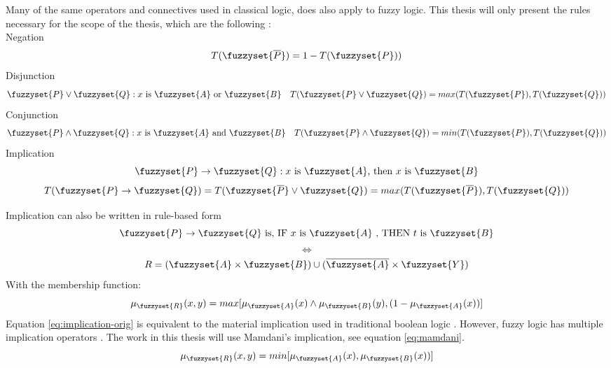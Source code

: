 Many of the same operators and connectives used in classical logic, does also apply to fuzzy logic. This thesis will only present the rules necessary for the scope of the thesis, which are the following \cite{ross2009fuzzy}:\\
\noindent Negation
\begin{equation}
    T(\fuzzyset{\overline{P}})=1-T(\fuzzyset{P})) {}\label{eq:negation}
\end{equation}
Disjunction
\begin{equation}
    \fuzzyset{P}\lor \fuzzyset{Q}:x \text{ is } \fuzzyset{A} \text{ or } \fuzzyset{B}\quad T(\fuzzyset{P} \lor \fuzzyset{Q})=max(T(\fuzzyset{P}),T(\fuzzyset{Q}))\label{eq:disjunction}
\end{equation}
Conjunction
\begin{equation}
    \fuzzyset{P}\land \fuzzyset{Q}:x \text{ is } \fuzzyset{A} \text{ and } \fuzzyset{B}\quad T(\fuzzyset{P} \land \fuzzyset{Q})=min(T(\fuzzyset{P}),T(\fuzzyset{Q}))\label{eq:conjunction}
\end{equation}
Implication
\begin{equation}
    \fuzzyset{P}\to \fuzzyset{Q}: x \text{ is } \fuzzyset{A} \text{, then }x \text{ is } \fuzzyset{B}
    \label{eq:implication}
\end{equation}
\[ T(\fuzzyset{P}\to \fuzzyset{Q})=T(\fuzzyset{\overline{P}}\lor\fuzzyset{Q})=max(T(\fuzzyset{\overline{P}}),T(\fuzzyset{Q}))  \]

\noindent Implication can also be written in rule-based form
\[ \fuzzyset{P} \to \fuzzyset{Q} \text{ is,  IF } x \text{ is } \fuzzyset{A} \text{ , THEN } t \text{ is } \fuzzyset{B}\]
\[ \Leftrightarrow \]
\[  R=(\fuzzyset{A}\times\fuzzyset{B})\cup (\overline{\fuzzyset{A}}\times \fuzzyset{Y})\]
\noindent With the membership function:
\begin{equation}
    \mu_{\fuzzyset{R}}(x,y)=max[\mu_{\fuzzyset{A}}(x)\land\mu_{\fuzzyset{B}}(y),(1-\mu_{\fuzzyset{A}}(x))]
    \label{eq:implication-orig}
\end{equation}
Equation \ref{eq:implication-orig} is equivalent to the material implication used in traditional boolean logic \cite{ying2002implication}. However, fuzzy logic has multiple implication operators \cite{ross2009fuzzy}. The work in this thesis will use Mamdani's implication, see equation \ref{eq:mamdani}.
\begin{equation}
    \mu_{\fuzzyset{R}}(x,y)=min[\mu_{\fuzzyset{A}}(x),\mu_{\fuzzyset{B}}(x))]
    \label{eq:mamdani}
\end{equation}




